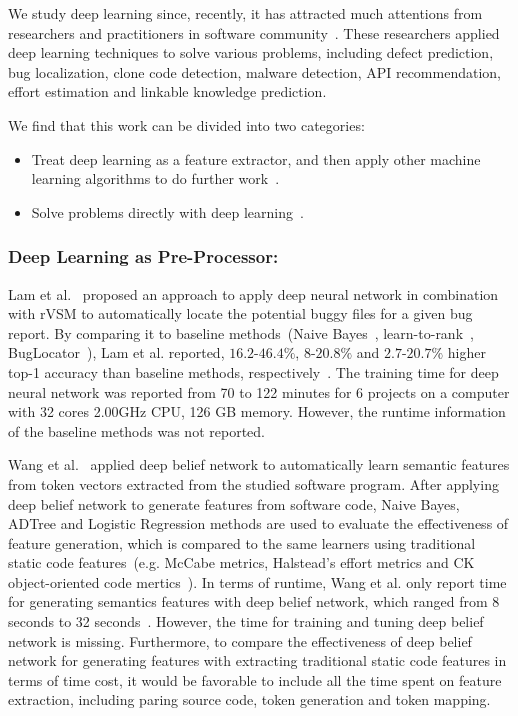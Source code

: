 \documentclass[sigconf]{acmart}
\theoremstyle{break}
\newcommand{\bi}{\begin{itemize}[leftmargin=0.4cm]}
\newcommand{\ei}{\end{itemize}}
\begin{document}
We study deep learning since, recently, it  has attracted 
much attentions from researchers and practitioners in software
 community~\cite{wang2016automatically, gu2016deep, xu2016predicting,white2016deep,white2015toward,lam2015combining,choetkiertikul2016deep,yuan2014droid,mou2016convolutional}.
 These researchers applied  deep learning techniques to solve various problems,
 including defect prediction, bug localization, clone code detection, malware detection, API recommendation, 
 effort estimation and linkable knowledge prediction.
 
We find that this work   can be divided into   two categories:
 
\bi
\item Treat deep learning as a feature extractor, and then apply other  machine learning algorithms to do further work~\cite{lam2015combining,wang2016automatically,choetkiertikul2016deep}.
\item Solve problems directly with  deep learning~\cite{gu2016deep,xu2016predicting,white2016deep,white2015toward,yuan2014droid,mou2016convolutional}.
\ei
\noindent
\subsubsection{Deep Learning as  Pre-Processor:}

Lam et al.~\cite{lam2015combining}  proposed an approach to apply deep neural network
 in combination with rVSM to automatically locate the potential buggy files for a given
 bug report. By comparing it to baseline methods~(Naive Bayes~\cite{kim2013should}, learn-to-rank~\cite{ye2014learning}, 
 BugLocator~\cite{zhou2012should}), Lam et al. reported, $\mbox{16.2-46.4}\%$, $\mbox{8-20.8}\%$  and $\mbox{2.7-20.7}\%$ 
 higher top-1 accuracy than baseline methods, respectively~\cite{lam2015combining}. The training time for deep neural
 network was reported from 70 to 122 minutes for 6 projects on a computer with 32 cores 2.00GHz CPU,
 126 GB memory. However,
 the runtime information of the baseline methods was not reported.
 
 Wang et al.~\cite{wang2016automatically} applied deep belief network to automatically
 learn semantic features from token vectors extracted from the studied software program. After
 applying deep belief network to generate features from software code,
 Naive Bayes, ADTree and Logistic Regression methods are used to evaluate the effectiveness
 of feature generation, which is compared to the same learners using traditional 
 static code features~(e.g.  McCabe metrics, Halstead's effort metrics and  CK object-oriented code mertics~\cite{kafura1987use,chidamber1994metrics,mccabe1976complexity,halstead1977elements}). In terms of
 runtime, Wang et al. only report time for generating semantics features with deep belief network, which
 ranged from 8 seconds to 32 seconds~\cite{wang2016automatically}. However, the time for training and tuning deep belief network is
 missing. Furthermore, to compare the effectiveness of deep belief network for generating features with extracting traditional 
 static code features in terms of time cost, 
 it would be favorable to include all the time spent on feature extraction, including
 paring source code, token generation and token mapping.
 
\end{document}
